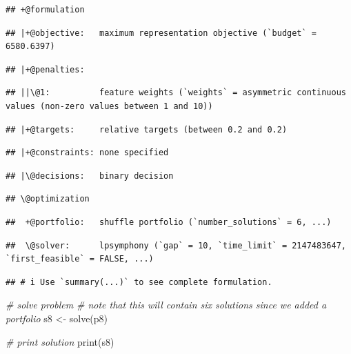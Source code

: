 \documentclass[
  12pt,
]{book}
\newenvironment{Shaded}{\begin{snugshade}}{\end{snugshade}}
\newcommand{\CommentTok}[1]{\textcolor[rgb]{0.56,0.35,0.01}{\textit{#1}}}
\newcommand{\FunctionTok}[1]{\textcolor[rgb]{0.00,0.00,0.00}{#1}}
\newcommand{\NormalTok}[1]{#1}
\newcommand{\OtherTok}[1]{\textcolor[rgb]{0.56,0.35,0.01}{#1}}
\begin{document}
\begin{verbatim}
## +@formulation
\end{verbatim}

\begin{verbatim}
## |+@objective:   maximum representation objective (`budget` = 6580.6397)
\end{verbatim}

\begin{verbatim}
## |+@penalties:
\end{verbatim}

\begin{verbatim}
## ||\@1:          feature weights (`weights` = asymmetric continuous values (non-zero values between 1 and 10))
\end{verbatim}

\begin{verbatim}
## |+@targets:     relative targets (between 0.2 and 0.2)
\end{verbatim}

\begin{verbatim}
## |+@constraints: none specified
\end{verbatim}

\begin{verbatim}
## |\@decisions:   binary decision
\end{verbatim}

\begin{verbatim}
## \@optimization
\end{verbatim}

\begin{verbatim}
##  +@portfolio:   shuffle portfolio (`number_solutions` = 6, ...)
\end{verbatim}

\begin{verbatim}
##  \@solver:      lpsymphony (`gap` = 10, `time_limit` = 2147483647, `first_feasible` = FALSE, ...)
\end{verbatim}

\begin{verbatim}
## # i Use `summary(...)` to see complete formulation.
\end{verbatim}

\begin{Shaded}
\begin{Highlighting}[]
\CommentTok{\# solve problem}
\CommentTok{\# note that this will contain six solutions since we added a portfolio}
\NormalTok{s8 }\OtherTok{\textless{}{-}} \FunctionTok{solve}\NormalTok{(p8)}

\CommentTok{\# print solution}
\FunctionTok{print}\NormalTok{(s8)}
\end{Highlighting}
\end{Shaded}
\end{document}
